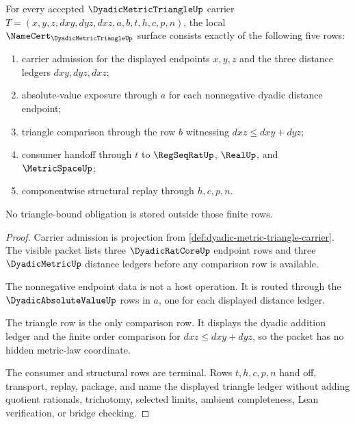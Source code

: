 \begin{theorem}
\label{thm:dyadic-metric-triangle-namecert-obligations}
For every accepted $\DyadicMetricTriangleUp$ carrier $T=(x,y,z,dxy,dyz,dxz,a,b,t,h,c,p,n)$, the local $\NameCert_{\DyadicMetricTriangleUp}$ surface consists exactly of the following five rows:
\begin{enumerate}
\item carrier admission for the displayed endpoints $x,y,z$ and the three distance ledgers $dxy,dyz,dxz$;
\item absolute-value exposure through $a$ for each nonnegative dyadic distance endpoint;
\item triangle comparison through the row $b$ witnessing $dxz \leq dxy + dyz$;
\item consumer handoff through $t$ to $\RegSeqRatUp$, $\RealUp$, and $\MetricSpaceUp$;
\item componentwise structural replay through $h,c,p,n$.
\end{enumerate}
No triangle-bound obligation is stored outside those finite rows.
\end{theorem}
\begin{proof}
Carrier admission is projection from \autoref{def:dyadic-metric-triangle-carrier}. The visible packet lists three $\DyadicRatCoreUp$ endpoint rows and three $\DyadicMetricUp$ distance ledgers before any comparison row is available.

The nonnegative endpoint data is not a host operation. It is routed through the $\DyadicAbsoluteValueUp$ rows in $a$, one for each displayed distance ledger.

The triangle row is the only comparison row. It displays the dyadic addition ledger and the finite order comparison for $dxz \leq dxy + dyz$, so the packet has no hidden metric-law coordinate.

The consumer and structural rows are terminal. Rows $t,h,c,p,n$ hand off, transport, replay, package, and name the displayed triangle ledger without adding quotient rationals, trichotomy, selected limits, ambient completeness, Lean verification, or bridge checking.
\end{proof}

